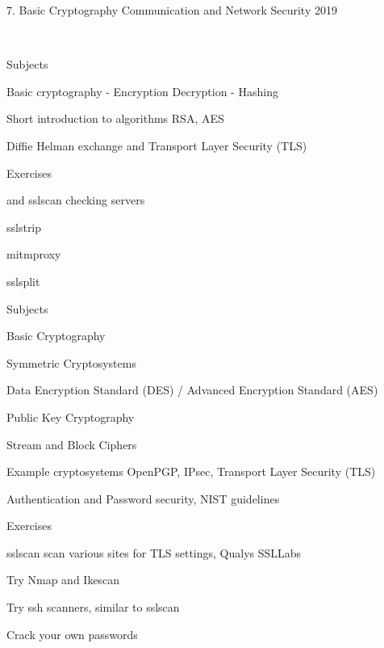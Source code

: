 \documentclass[Screen16to9,17pt]{foils}
\begin{document}
\mytitlepage
{7. Basic Cryptography}
{Communication and Network Security 2019}



{~}

\begin{list1}
\item Subjects
\begin{list2}
\item Basic cryptography - Encryption Decryption - Hashing
\item Short introduction to algorithms RSA, AES
\item Diffie Helman exchange and Transport Layer Security (TLS)
\end{list2}
\item Exercises
\begin{list2}
\item {} and sslscan checking servers
\item sslstrip 
\item mitmproxy 
\item sslsplit 
\end{list2}
\end{list1}

\begin{list1}
\item Subjects
\begin{list2}
\item Basic Cryptography
\item Symmetric Cryptosystems
\item Data Encryption Standard (DES) / Advanced Encryption Standard (AES)
\item Public Key Cryptography
\item Stream and Block Ciphers
\item Example cryptosystems OpenPGP, IPsec, Transport Layer Security (TLS)
\item Authentication and Password security, NIST guidelines
\end{list2}
\item Exercises
\begin{list2}
\item sslscan scan various sites for TLS settings, Qualys SSLLabs
\item Try Nmap and Ikescan
\item Try ssh scanners, similar to sslscan
\item Crack your own passwords
\end{list2}
\end{list1}
\end{document}
